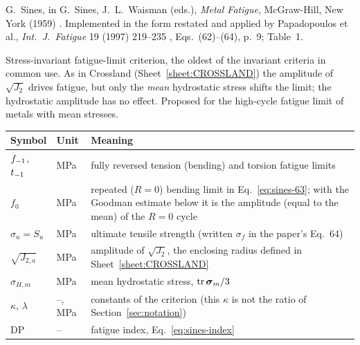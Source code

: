 \label{sheet:SINES}

 G.~Sines, in G.~Sines, J.~L.~Waisman (eds.), \emph{Metal Fatigue}, McGraw-Hill, New
York (1959) \cite{sines1959}. Implemented in the form restated and applied by Papadopoulos et al.,
\emph{Int.\ J.\ Fatigue} 19 (1997) 219--235 \cite{papadopoulos1997}, Eqs.~(62)--(64), p.~9; Table~1.

 Stress-invariant fatigue-limit criterion, the oldest of the invariant criteria
in common use. As in Crossland (Sheet~\ref{sheet:CROSSLAND}) the amplitude of $\sqrt{J_2}$ drives
fatigue, but only the \emph{mean} hydrostatic stress shifts the limit; the hydrostatic amplitude has
no effect. Proposed for the high-cycle fatigue limit of metals with mean stresses.

\begin{center}\small
\begin{tabular}{@{}llp{100mm}@{}}
\toprule
Symbol & Unit & Meaning\\\midrule
$f_{-1}$, $t_{-1}$ & MPa & fully reversed tension (bending) and torsion fatigue limits\\
$f_0$ & MPa & repeated ($R=0$) bending limit in Eq.~\eqref{eq:sines-63}; with the Goodman estimate below it is the amplitude (equal to the mean) of the $R=0$ cycle\\
$\sigma_u=S_u$ & MPa & ultimate tensile strength (written $\sigma_f$ in the paper's Eq.~64)\\
$\sqrt{J_{2,a}}$ & MPa & amplitude of $\sqrt{J_2}$, the enclosing radius defined in Sheet~\ref{sheet:CROSSLAND}\\
$\sigma_{H,m}$ & MPa & mean hydrostatic stress, $\operatorname{tr}\boldsymbol\sigma_m/3$\\
$\kappa$, $\lambda$ & --, MPa & constants of the criterion (this $\kappa$ is not the ratio of Section~\ref{sec:notation})\\
$\mathrm{DP}$ & -- & fatigue index, Eq.~\eqref{eq:sines-index}\\
\bottomrule
\end{tabular}
\end{center}

